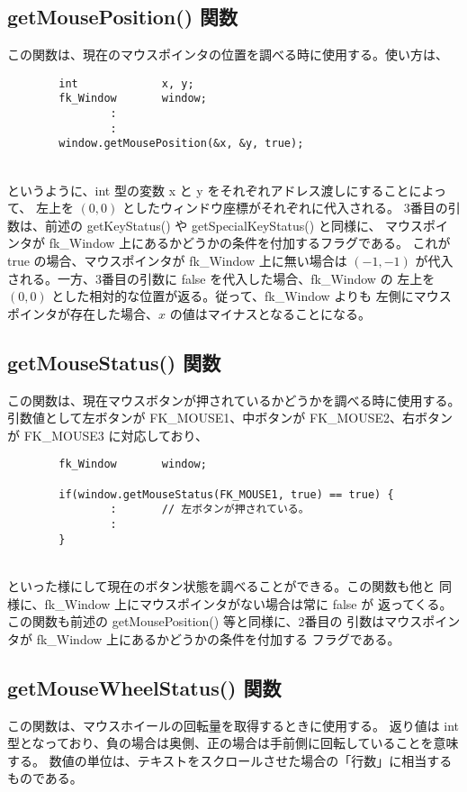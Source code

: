 \subsection*{getMousePosition() 関数}
この関数は、現在のマウスポインタの位置を調べる時に使用する。使い方は、
\\
\begin{breakbox}
\begin{verbatim}
        int             x, y;
        fk_Window       window;
                :
                :
        window.getMousePosition(&x, &y, true);
\end{verbatim}
\end{breakbox}
~ \\
というように、int 型の変数 x と y をそれぞれアドレス渡しにすることによって、
左上を \((0, 0)\) としたウィンドウ座標がそれぞれに代入される。
3番目の引数は、前述の getKeyStatus() や getSpecialKeyStatus() と同様に、
マウスポインタが fk\_Window 上にあるかどうかの条件を付加するフラグである。
これが true の場合、マウスポインタが fk\_Window 上に無い場合は \((-1, -1)\)
が代入される。一方、3番目の引数に false を代入した場合、fk\_Window の
左上を \((0, 0)\) とした相対的な位置が返る。従って、fk\_Window よりも
左側にマウスポインタが存在した場合、\(x\) の値はマイナスとなることになる。

\subsection*{getMouseStatus() 関数}
この関数は、現在マウスボタンが押されているかどうかを調べる時に使用する。
引数値として左ボタンが FK\_MOUSE1、中ボタンが FK\_MOUSE2、右ボタンが
FK\_MOUSE3 に対応しており、
\\
\begin{breakbox}
\begin{verbatim}
        fk_Window       window;

        if(window.getMouseStatus(FK_MOUSE1, true) == true) {
                :       // 左ボタンが押されている。
                :
        }
\end{verbatim}
\end{breakbox}
~ \\
といった様にして現在のボタン状態を調べることができる。この関数も他と
同様に、fk\_Window 上にマウスポインタがない場合は常に false が
返ってくる。この関数も前述の getMousePosition() 等と同様に、2番目の
引数はマウスポインタが fk\_Window 上にあるかどうかの条件を付加する
フラグである。

\subsection*{getMouseWheelStatus() 関数}
この関数は、マウスホイールの回転量を取得するときに使用する。
返り値は int 型となっており、負の場合は奥側、正の場合は手前側に回転していることを意味する。
数値の単位は、テキストをスクロールさせた場合の「行数」に相当するものである。

